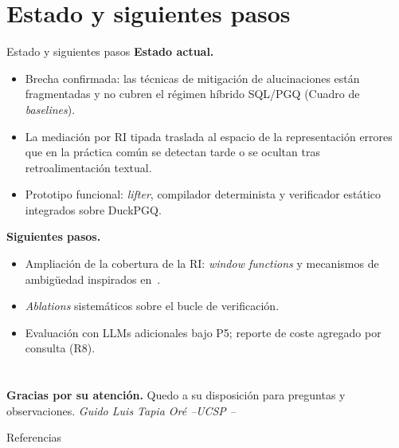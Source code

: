 \documentclass[aspectratio=169]{beamer}
\begin{document}
\section{Estado y siguientes pasos}




\begin{frame}{Estado y siguientes pasos}
\textbf{Estado actual.}
\begin{itemize}\small
    \item Brecha confirmada: las técnicas de mitigación de alucinaciones están fragmentadas y no cubren el régimen híbrido SQL/PGQ (Cuadro de \emph{baselines}).
    \item La mediación por RI tipada traslada al espacio de la representación errores que en la práctica común se detectan tarde o se ocultan tras retroalimentación textual.
    \item Prototipo funcional: \emph{lifter}, compilador determinista y verificador estático integrados sobre DuckPGQ.
\end{itemize}

\vspace{0.2cm}
\textbf{Siguientes pasos.}
\begin{itemize}\small
    \item Ampliación de la cobertura de la RI: \emph{window functions} y mecanismos de ambigüedad inspirados en~\parencite{AmbiSQL}.
    \item \emph{Ablations} sistemáticos sobre el bucle de verificación.
    \item Evaluación con LLMs adicionales bajo P5; reporte de coste agregado por consulta (R8).
\end{itemize}

\end{frame}

\section*{}

\begin{frame}[plain]
    \vfill
    \centering
    \Huge{\textbf{Gracias por su atención.}}
    \vfill
    \Large{Quedo a su disposición para preguntas y observaciones.}
    \vfill
    \small\textit{Guido Luis Tapia Or\'e \quad --\quad UCSP \quad --}
    \vfill
\end{frame}

\begin{frame}{Referencias}
    \printbibliography[heading=none]
\end{frame}
\end{document}
